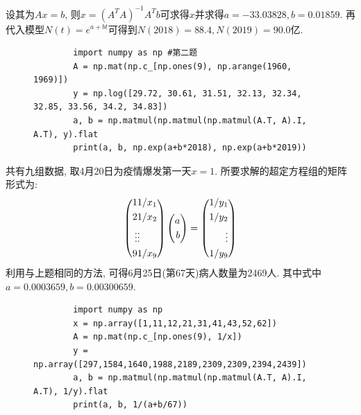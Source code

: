 \documentclass[UTF8,9pt]{ctexart}
\begin{document}
设其为$Ax=b$, 则$x=(A^TA)^{-1}A^Tb$可求得$x$并求得$a=-33.03828,b=0.01859$. 再代入模型$N(t)=e^{a+b t}$可得到$N(2018)=88.4, N(2019)=90.0$亿. 
\begin{figure}[htbp]
	\begin{lstlisting}
		import numpy as np #第二题
		A = np.mat(np.c_[np.ones(9), np.arange(1960, 1969)])
		y = np.log([29.72, 30.61, 31.51, 32.13, 32.34, 32.85, 33.56, 34.2, 34.83])
		a, b = np.matmul(np.matmul(np.matmul(A.T, A).I, A.T), y).flat
		print(a, b, np.exp(a+b*2018), np.exp(a+b*2019))		
	\end{lstlisting}
\end{figure}
共有九组数据, 取4月20日为疫情爆发第一天$x=1$. 所要求解的超定方程组的矩阵形式为:
$$\left(\begin{aligned} 1&1/x_1\\2&1/x_2\\\vdots&\vdots\\9&1/x_9 \end{aligned}\right)\left(\begin{aligned} a\\b \end{aligned}\right) = \left(\begin{aligned} 1/y_1\\1/y_2\\\vdots\\1/y_9 \end{aligned}\right)$$
利用与上题相同的方法, 可得6月25日(第67天)病人数量为2469人. 其中式中$a=0.0003659,b=0.00300659$.
\begin{figure}[htbp]
	\begin{lstlisting}
		import numpy as np
		x = np.array([1,11,12,21,31,41,43,52,62])
		A = np.mat(np.c_[np.ones(9), 1/x])
		y = np.array([297,1584,1640,1988,2189,2309,2309,2394,2439])
		a, b = np.matmul(np.matmul(np.matmul(A.T, A).I, A.T), 1/y).flat
		print(a, b, 1/(a+b/67))			
	\end{lstlisting}
\end{figure}
\end{document}
